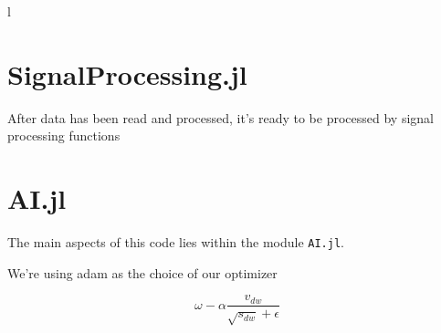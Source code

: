 


l



\section{SignalProcessing.jl}

After data has been read and processed, it's ready to be processed by signal processing functions 

\section{AI.jl}

The main aspects of this code lies within the module \texttt{AI.jl}. 






We're using \acrfull{adam} as the choice of our optimizer

\begin{equation}
    \omega - \alpha \frac{v_{dw}}  {\sqrt{s_{dw}} + \epsilon}
\end{equation}


